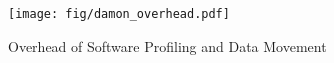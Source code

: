 \begin{figure}[t]
  \centering
  \texttt{[image: fig/damon\_overhead.pdf]}
  \vspace{-0.6cm}
  \caption{Overhead of Software Profiling and Data Movement}
  \vspace{-0.7cm}
  \label{fig:damon_overhead}
\end{figure}